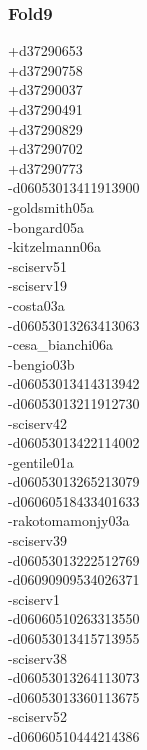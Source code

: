 \begin{multicols}{4}
\subsubsection*{Fold9}
+d37290653\\
+d37290758\\
+d37290037\\
+d37290491\\
+d37290829\\
+d37290702\\
+d37290773\\
-d06053013411913900\\
-goldsmith05a\\
-bongard05a\\
-kitzelmann06a\\
-sciserv51\\
-sciserv19\\
-costa03a\\
-d06053013263413063\\
-cesa\_bianchi06a\\
-bengio03b\\
-d06053013414313942\\
-d06053013211912730\\
-sciserv42\\
-d06053013422114002\\
-gentile01a\\
-d06053013265213079\\
-d06060518433401633\\
-rakotomamonjy03a\\
-sciserv39\\
-d06053013222512769\\
-d06090909534026371\\
-sciserv1\\
-d06060510263313550\\
-d06053013415713955\\
-sciserv38\\
-d06053013264113073\\
-d06053013360113675\\
-sciserv52\\
-d06060510444214386
\end{multicols}